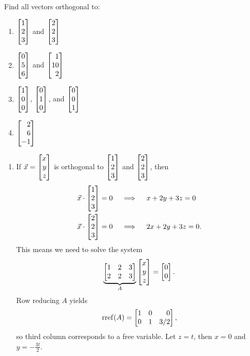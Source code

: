 \begin{exercises}
\begin{problist}
		\prob Find all vectors orthogonal to:
		\begin{enumerate}
			\item $\mat{1\\2\\3}$ and $\mat{2\\2\\3}$
			\item $\mat{0\\5\\6}$ and $\mat{1\\10\\2}$
			\item $\mat{1\\0\\0}$, $\mat{0\\1\\0}$, and $\mat{0\\0\\1}$
			\item $\mat{2\\6\\-1}$
		\end{enumerate}
		\begin{solution}
			\begin{enumerate}
				\item \label{PARTA} If $\vec{x} = \mat{x\\y\\z}$ is orthogonal to $\mat{1\\2\\3}$ and $\mat{2\\2\\3}$, then
				\begin{align*}
					\vec x \cdot \mat{1\\2\\3} &= 0 \quad\implies\quad x+2y+3z = 0 \\
					\vec x \cdot \mat{2\\2\\3} &= 0 \quad\implies\quad 2x+2y+3z = 0.
				\end{align*}
				This means we need to solve the system
				\[
					\underbrace{\mat{1&2&3\\2&2&3}}_{A} \mat{x\\y\\z} = \mat{0\\0}.
				\]
				Row reducing $A$ yields
				\[
					\rref(A) = \mat{1&0&0\\0&1&3/2},
				\]
				so third column corresponds to a free variable. Let $z=t$, then $x=0$ and $y = -\frac{3t}{2}$. 

\end{enumerate}
\end{solution}
\end{problist}
\end{exercises}

